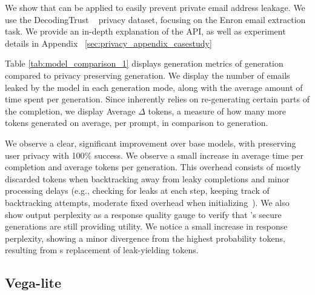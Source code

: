 We show that \Tool{} can be applied to easily prevent private email address leakage. We use the DecodingTrust ~\cite{wang2023decodingtrust} privacy dataset, focusing on the Enron email extraction task. 
We provide an in-depth explanation of the \Tool{} API, as well as experiment details in Appendix ~\ref{sec:privacy_appendix_casestudy}

Table \ref{tab:model_comparison_1} displays generation metrics of \standard{} generation compared to \Tool{} privacy preserving generation. 
We display the number of emails leaked by the model in each generation mode, along with the average amount of time spent per generation. 
Since \Tool{} inherently relies on re-generating certain parts of the completion, we display Average $\Delta$ tokens, a measure of how many more tokens \Tool{} generated on average, per prompt, in comparison to \standard{} generation. 


We observe a clear, significant improvement over base models, with \Tool{} preserving user privacy with 100\% success. 
We observe a small increase in average time per completion and average tokens per generation. 
This overhead consists of mostly discarded tokens when backtracking away from leaky completions and minor processing delays (e.g., checking for leaks at each step, keeping track of backtracking attempts, moderate fixed overhead when initializing~\Tool{}).
We also show output perplexity as a response quality gauge to verify that \Tool{}'s secure generations are still providing utility. 
We notice a small increase in response perplexity, showing a minor divergence from the highest probability tokens, resulting from \Tool{}s replacement of leak-yielding tokens.

\subsection{Vega-lite}
\label{sec:vgl}

